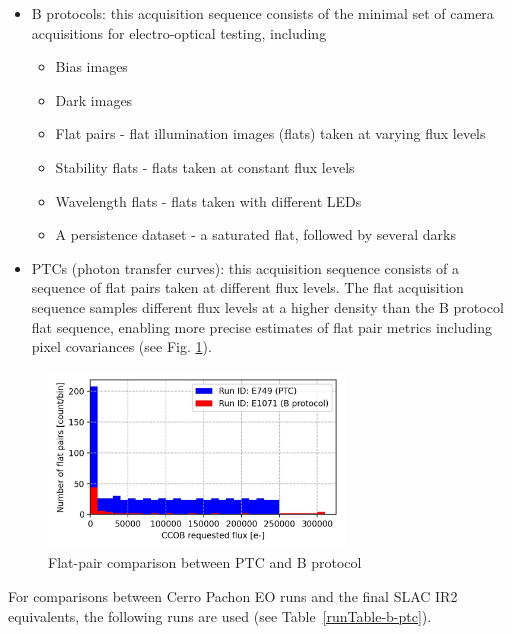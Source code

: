 \begin{itemize}
\tightlist
\item
  B protocols: this acquisition sequence consists of the minimal set of
  camera acquisitions for electro-optical testing, including

  \begin{itemize}
  \tightlist
  \item
    Bias images
  \item
    Dark images
  \item
    Flat pairs - flat illumination images (flats) taken at varying flux levels
  \item
    Stability flats - flats taken at constant flux levels
  \item
    Wavelength flats - flats taken with different LEDs
  \item
    A persistence dataset - a saturated flat, followed by several darks
  \end{itemize}
\item
  PTCs (photon transfer curves): this acquisition sequence consists of a
  sequence of flat pairs taken at different flux levels. The flat
  acquisition sequence samples different flux levels at a higher density
  than the B protocol flat sequence, enabling more precise estimates of
  flat pair metrics including pixel covariances (see Fig. \ref{fig:PTC_BProtocol_Comparison}).
\end{itemize}

\begin{figure}[ht]
\begin{centering}
\includegraphics[width=0.7\textwidth]{figures/baselineCharacterization/PTC_BProtocol_Comparison.jpg}
	\caption{Flat-pair comparison between PTC and B protocol
\label{fig:PTC_BProtocol_Comparison}}
\end{centering}
\end{figure}

For comparisons between Cerro Pachon EO runs and the final SLAC IR2 equivalents, the following runs are used (see Table~\ref{runTable-b-ptc}).

